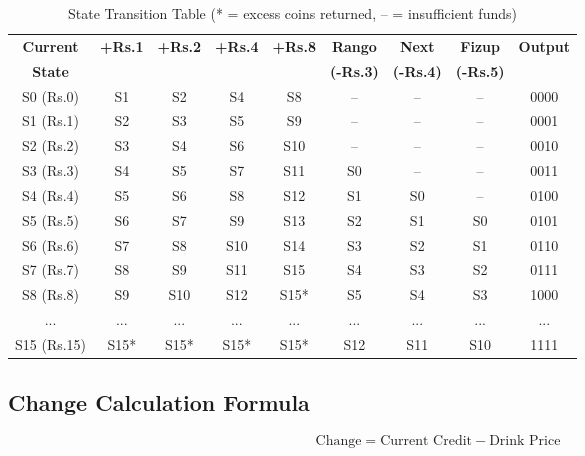 \documentclass[12pt,a4paper]{article}
\begin{document}
\begin{table}[H]
    \centering
    \footnotesize
    \begin{tabular}{|c|c|c|c|c|c|c|c|c|}
        \hline
        \textbf{Current} & \textbf{+Rs.1} & \textbf{+Rs.2} & \textbf{+Rs.4} & \textbf{+Rs.8} & \textbf{Rango} & \textbf{Next} & \textbf{Fizup} & \textbf{Output} \\
        \textbf{State} & & & & & \textbf{(-Rs.3)} & \textbf{(-Rs.4)} & \textbf{(-Rs.5)} & \\
        \hline
        S0 (Rs.0) & S1 & S2 & S4 & S8 & -- & -- & -- & 0000 \\
        S1 (Rs.1) & S2 & S3 & S5 & S9 & -- & -- & -- & 0001 \\
        S2 (Rs.2) & S3 & S4 & S6 & S10 & -- & -- & -- & 0010 \\
        S3 (Rs.3) & S4 & S5 & S7 & S11 & S0 & -- & -- & 0011 \\
        S4 (Rs.4) & S5 & S6 & S8 & S12 & S1 & S0 & -- & 0100 \\
        S5 (Rs.5) & S6 & S7 & S9 & S13 & S2 & S1 & S0 & 0101 \\
        S6 (Rs.6) & S7 & S8 & S10 & S14 & S3 & S2 & S1 & 0110 \\
        S7 (Rs.7) & S8 & S9 & S11 & S15 & S4 & S3 & S2 & 0111 \\
        S8 (Rs.8) & S9 & S10 & S12 & S15* & S5 & S4 & S3 & 1000 \\
        ... & ... & ... & ... & ... & ... & ... & ... & ... \\
        S15 (Rs.15) & S15* & S15* & S15* & S15* & S12 & S11 & S10 & 1111 \\
        \hline
    \end{tabular}
    \caption{State Transition Table (* = excess coins returned, -- = insufficient funds)}
\end{table}

\subsection{Change Calculation Formula}

\begin{equation}
\text{Change} = \text{Current Credit} - \text{Drink Price}
\end{equation}
\end{document}
